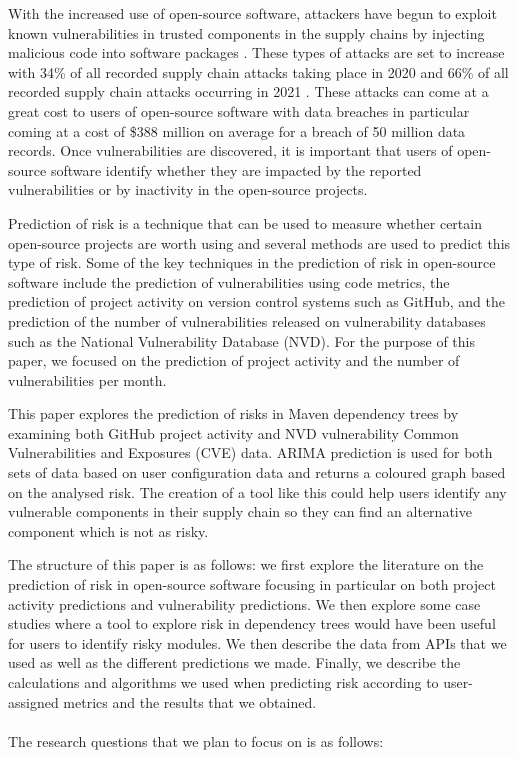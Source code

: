 \documentclass[conference]{IEEEtran}
\begin{document}
With the increased use of open-source software, attackers have begun to exploit known vulnerabilities in trusted components in the supply chains by injecting malicious code into software packages \cite{ohm_backstabbers_2020}. These types of attacks are set to increase with 34\% of all recorded supply chain attacks taking place in 2020 and 66\% of all recorded supply chain attacks occurring in 2021 \cite{m_z_malik_protection_2023}. These attacks can come at a great cost to users of open-source software with data breaches in particular coming at a cost of \$388 million on average for a breach of 50 million data records\cite{x_wang_feasibility_2021}. Once vulnerabilities are discovered, it is important that users of open-source software identify whether they are impacted by the reported vulnerabilities or by inactivity in the open-source projects. 

Prediction of risk is a technique that can be used to measure whether certain open-source projects are worth using and several methods are used to predict this type of risk. Some of the key techniques in the prediction of risk in open-source software include the prediction of vulnerabilities using code metrics, the prediction of project activity on version control systems such as GitHub, and the prediction of the number of vulnerabilities released on vulnerability databases such as the National Vulnerability Database (NVD). For the purpose of this paper, we focused on the prediction of project activity and the number of vulnerabilities per month. 

This paper explores the prediction of risks in Maven dependency trees by examining both GitHub project activity and NVD vulnerability Common Vulnerabilities and Exposures (CVE) data. ARIMA prediction is used for both sets of data based on user configuration data and returns a coloured graph based on the analysed risk. The creation of a tool like this could help users identify any vulnerable components in their supply chain so they can find an alternative component which is not as risky. 

The structure of this paper is as follows: we first explore the literature on the prediction of risk in open-source software focusing in particular on both project activity predictions and vulnerability predictions. We then explore some case studies where a tool to explore risk in dependency trees would have been useful for users to identify risky modules. We then describe the data from APIs that we used as well as the different predictions we made. Finally, we describe the calculations and algorithms we used when predicting risk according to user-assigned metrics and the results that we obtained. 
\\\\
The research questions that we plan to focus on is as follows:\\
\end{document}
